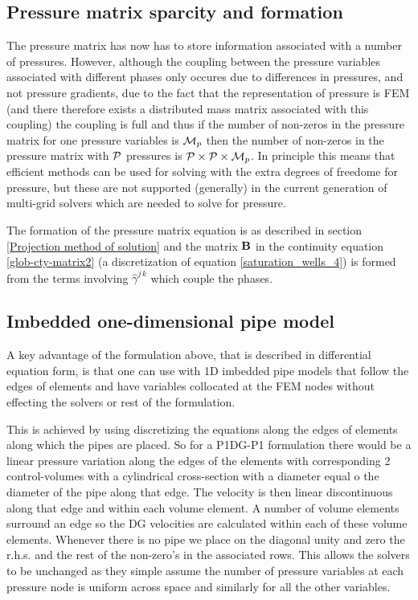 \subsection{Pressure matrix sparcity and formation} 
\label{Pressure matrix sparcity}
The pressure matrix has now has to store information associated with a number of pressures. 
However, although the coupling between the pressure variables associated with different phases only occures 
due to  differences in pressures, and not pressure gradients, due to the fact that the representation of 
pressure is FEM (and there therefore exists a distributed mass matrix associated with this coupling) 
the coupling is full and thus if the number of non-zeros in the pressure matrix 
for one pressure variables is ${\cal M}_p$ then the number of non-zeros in the pressure 
matrix with ${\cal P}$ pressures is  ${\cal P}\times{\cal P}\times{\cal M}_p$. 
In principle this means that efficient methods can be used for solving with the extra degrees of 
freedome for pressure, but these are not supported (generally) in the current generation of 
multi-grid solvers which are needed to solve for pressure. 

The formation of the pressure matrix equation is as described in section \ref{Projection method of solution} and the matrix ${\bf B}$ in the continuity equation \ref{glob-cty-matrix2} (a discretization of equation \ref{saturation_wells_4}) is formed from the terms involving $\hat\gamma^{j\, k}$ which couple the phases. 




\subsection{Imbedded one-dimensional pipe model} 
\label{1d-well-dicsretization}
A key advantage of the formulation above, that is described in differential equation 
form, is that one can use with 1D imbedded pipe models that 
follow the edges of elements and have variables collocated at the FEM nodes without 
effecting the solvers or rest of the formulation. 

This is achieved by using discretizing the equations along the edges of elements along which the 
pipes are placed. So for a P1DG-P1 formulation there would be a linear pressure variation 
along the edges of the elements with corresponding 2 control-volumes with a cylindrical 
cross-section with a diameter equal o the diameter of the pipe along that edge. The velocity 
is then linear discontinuous along that edge and within each volume element. 
A number of volume elements surround an edge so the DG velocities are calculated within 
each of these volume elements. Whenever there is no pipe we place on the diagonal unity and 
zero the r.h.s. and the rest of the non-zero's in the associated rows. 
This allows the solvers to be unchanged as they simple assume the number of pressure variables 
at each pressure node is uniform across space and similarly for all the other variables. 


